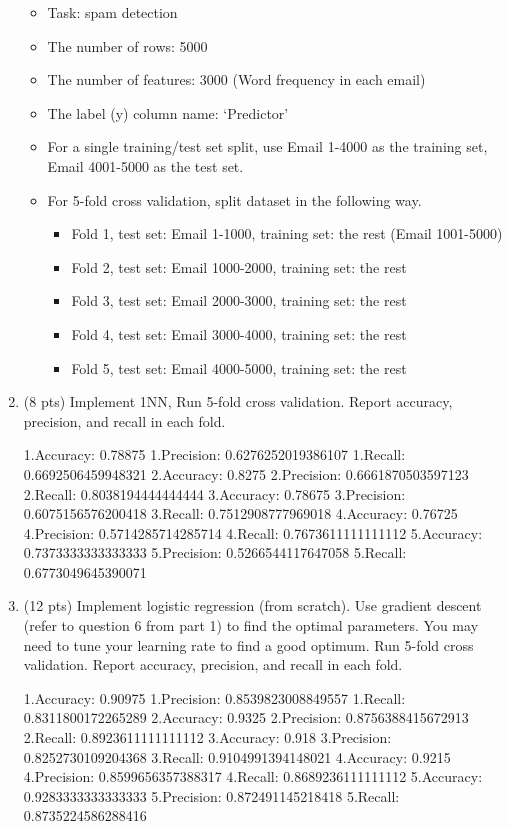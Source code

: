 \documentclass[a4paper]{article}
\theoremstyle{definition}
\newenvironment{soln}{
    \leavevmode\color{blue}\ignorespaces
}{}
\begin{document}
\begin{enumerate}
	\begin{itemize}
		\item Task: spam detection
		\item The number of rows: 5000
		\item The number of features: 3000 (Word frequency in each email)
		\item The label (y) column name: `Predictor'
		\item For a single training/test set split, use Email 1-4000 as the training set, Email 4001-5000 as the test set.
		\item For 5-fold cross validation, split dataset in the following way.
		\begin{itemize}
			\item Fold 1, test set: Email 1-1000, training set: the rest (Email 1001-5000)
			\item Fold 2, test set: Email 1000-2000, training set: the rest
			\item Fold 3, test set: Email 2000-3000, training set: the rest
			\item Fold 4, test set: Email 3000-4000, training set: the rest
			\item Fold 5, test set: Email 4000-5000, training set: the rest			
		\end{itemize}
	\end{itemize}
	
	\item (8 pts) Implement 1NN, Run 5-fold cross validation. Report accuracy, precision, and recall in each fold.
	\begin{soln}
 \obeylines
 1.Accuracy: 0.78875
1.Precision: 0.6276252019386107
1.Recall: 0.6692506459948321
2.Accuracy: 0.8275
2.Precision: 0.6661870503597123
2.Recall: 0.8038194444444444
3.Accuracy: 0.78675
3.Precision: 0.6075156576200418
3.Recall: 0.7512908777969018
4.Accuracy: 0.76725
4.Precision: 0.5714285714285714
4.Recall: 0.7673611111111112
5.Accuracy: 0.7373333333333333
5.Precision: 0.5266544117647058
5.Recall: 0.6773049645390071 
\end{soln}
	\vspace{100}
	\item (12 pts) Implement logistic regression (from scratch). Use gradient descent (refer to question 6 from part 1) to find the optimal parameters. You may need to tune your learning rate to find a good optimum. Run 5-fold cross validation. Report accuracy, precision, and recall in each fold.
	
	\begin{soln}  
 \obeylines
1.Accuracy: 0.90975
1.Precision: 0.8539823008849557
1.Recall: 0.8311800172265289
2.Accuracy: 0.9325
2.Precision: 0.8756388415672913
2.Recall: 0.8923611111111112
3.Accuracy: 0.918
3.Precision: 0.8252730109204368
3.Recall: 0.9104991394148021
4.Accuracy: 0.9215
4.Precision: 0.8599656357388317
4.Recall: 0.8689236111111112
5.Accuracy: 0.9283333333333333
5.Precision: 0.872491145218418
5.Recall: 0.8735224586288416
 \end{soln}
	

\end{enumerate}
\end{document}
